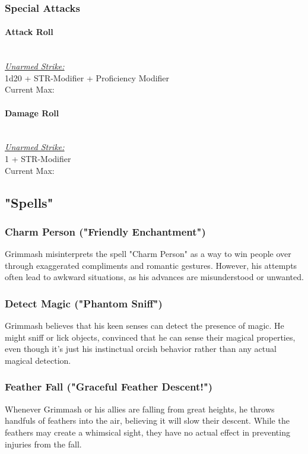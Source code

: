 \documentclass[letterpaper,openany,oneside,twocolumn]{book}
\begin{document}
\subsubsection*{Special Attacks}
\paragraph*{Attack Roll}\hfill\\
\underline{\textit{Unarmed Strike:}}\\
1d20 + STR-Modifier + Proficiency Modifier\\
\indent Current Max: 
\paragraph*{Damage Roll}\hfill\\
\underline{\textit{Unarmed Strike:}}\\
1 + STR-Modifier\\
\indent Current Max: 

\subsection*{"Spells"}
\subsubsection*{Charm Person ("Friendly Enchantment")}
Grimmash misinterprets the spell "Charm Person" as a way to win people over through exaggerated compliments and romantic gestures. However, his attempts often lead to awkward situations, as his advances are misunderstood or unwanted.
\subsubsection*{Detect Magic ("Phantom Sniff")}
Grimmash believes that his keen senses can detect the presence of magic. He might sniff or lick objects, convinced that he can sense their magical properties, even though it's just his instinctual orcish behavior rather than any actual magical detection.
\subsubsection*{Feather Fall ("Graceful Feather Descent!")}
Whenever Grimmash or his allies are falling from great heights, he throws handfuls of feathers into the air, believing it will slow their descent. While the feathers may create a whimsical sight, they have no actual effect in preventing injuries from the fall.
\end{document}
